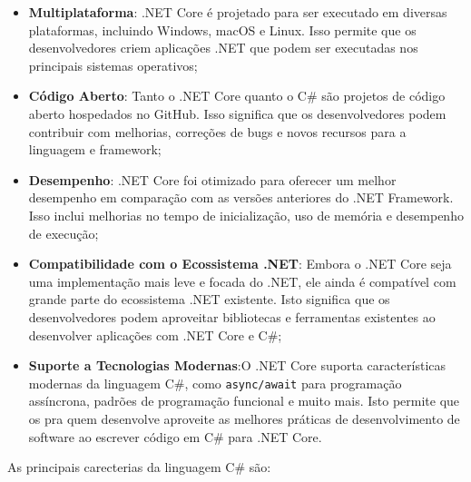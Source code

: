 \begin{itemize}
\item \textbf{Multiplataforma}:  .NET Core é projetado para ser executado em diversas 
plataformas, incluindo Windows, macOS e Linux. Isso permite que os desenvolvedores criem 
aplicações .NET que podem ser executadas nos principais sistemas operativos;
\item \textbf{Código Aberto}: Tanto o .NET Core quanto o C\# são projetos de código
aberto hospedados no GitHub. Isso significa que os desenvolvedores podem contribuir
com melhorias, correções de bugs e novos recursos para a linguagem e framework;
\item \textbf{Desempenho}:  .NET Core foi otimizado para oferecer um melhor desempenho
em comparação com as versões anteriores do .NET Framework. 
Isso inclui melhorias no tempo de inicialização, uso de memória e desempenho de execução;
\item \textbf{Compatibilidade com o Ecossistema .NET}: Embora o .NET Core seja uma 
implementação mais leve e focada do .NET, ele ainda é compatível com grande parte
do ecossistema .NET existente. Isto significa que os desenvolvedores podem aproveitar
bibliotecas e ferramentas existentes ao desenvolver aplicações com .NET Core e C\#;
\item \textbf{Suporte a Tecnologias Modernas}:O .NET Core suporta características 
modernas da linguagem C\#, como \texttt{async/await} para programação assíncrona, padrões de 
programação funcional e muito mais. Isto permite que os pra quem desenvolve aproveite as 
melhores práticas de desenvolvimento de software ao escrever código em C\# para .NET Core.
\end{itemize}


As principais carecterias da linguagem C\# são:


